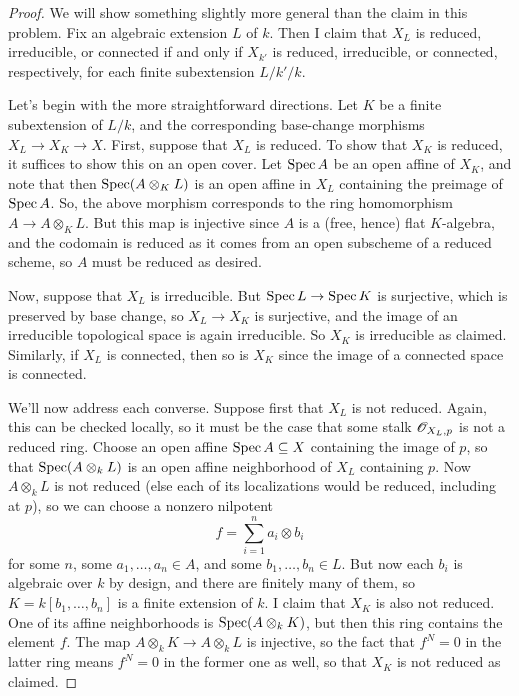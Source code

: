 \begin{proof}
	We will show something slightly more general than the claim in this problem. Fix an algebraic extension $L$ of $k$. Then I claim that $X_L$ is reduced, irreducible, or connected if and only if $X_{k'}$ is reduced, irreducible, or connected, respectively, for each finite subextension $L/k'/k$.
	
	Let's begin with the more straightforward directions. Let $K$ be a finite subextension of $L/k$, and the corresponding base-change morphisms $X_L \to X_K \to X$. First, suppose that $X_L$ is reduced. To show that $X_K$ is reduced, it suffices to show this on an open cover. Let $\operatorname{Spec} A$ be an open affine of $X_K$, and note that then $\operatorname{Spec}(A \otimes_K L)$ is an open affine in $X_L$ containing the preimage of $\operatorname{Spec} A$. So, the above morphism corresponds to the ring homomorphism $A \to A \otimes_K L$. But this map is injective since $A$ is a (free, hence) flat $K$-algebra, and the codomain is reduced as it comes from an open subscheme of a reduced scheme, so $A$ must be reduced as desired.
	
	Now, suppose that $X_L$ is irreducible. But $\operatorname{Spec} L \to \operatorname{Spec} K$ is surjective, which is preserved by base change, so $X_L \to X_K$ is surjective, and the image of an irreducible topological space is again irreducible. So $X_K$ is irreducible as claimed. Similarly, if $X_L$ is connected, then so is $X_K$ since the image of a connected space is connected.
	
	We'll now address each converse. Suppose first that $X_L$ is not reduced. Again, this can be checked locally, so it must be the case that some stalk $\mathscr{O}_{X_L,p}$ is not a reduced ring. Choose an open affine $\operatorname{Spec} A \subseteq X$ containing the image of $p$, so that $\operatorname{Spec}(A \otimes_k L)$ is an open affine neighborhood of $X_L$ containing $p$. Now $A \otimes_k L$ is not reduced (else each of its localizations would be reduced, including at $p$), so we can choose a nonzero nilpotent
	\[ f = \sum_{i=1}^n a_i \otimes b_i \]
	for some $n$, some $a_1,\ldots,a_n \in A$, and some $b_1,\ldots,b_n \in L$. But now each $b_i$ is algebraic over $k$ by design, and there are finitely many of them, so $K = k[b_1,\ldots,b_n]$ is a finite extension of $k$. I claim that $X_K$ is also not reduced. One of its affine neighborhoods is $\operatorname{Spec}(A \otimes_k K)$, but then this ring contains the element $f$. The map $A \otimes_k K \to A \otimes_k L$ is injective, so the fact that $f^N = 0$ in the latter ring means $f^N=0$ in the former one as well, so that $X_K$ is not reduced as claimed.
	

\end{proof}
